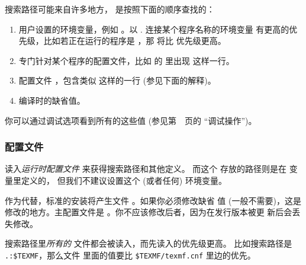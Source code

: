 \documentclass{article}
\begin{document}
搜索路径可能来自许多地方，\KPS{} 是按照下面的顺序查找的：

\begin{enumerate}
\item
  用户设置的环境变量，例如 \@。以 . 连接某个程序名称的环境变量
有更高的优先级，比如若正在运行的程序是 ，那 
将比  优先级更高。
\item
  专门针对某个程序的配置文件，比如  的  里出现
 这样一行。
\item   \KPS{} 配置文件 ，包含类似
   这样的一行 (参见下面的解释)。
\item 编译时的缺省值。
\end{enumerate}
\noindent 你可以通过调试选项看到所有的这些值 (参见第~\pageref{sec:debugging}~页的
``调试操作'')。

\subsubsection{配置文件}

\KPS{} 读入\emph{运行时配置文件}  来获得搜索路径和其他定义。
而这个  存放的路径则是在  变量里定义的，
但我们不建议设置这个 (或者任何) 环境变量。

作为代替，标准的安装将产生文件 。如果你必须修改缺省
值 (一般不需要)，这是修改的地方。主配置文件是
。你不应该修改后者，因为在发行版本被更
新后会丢失修改。

搜索路径里\emph{所有的}  文件都会被读入，而先读入的优先级更高。
比如搜索路径是 \verb|.:$TEXMF|，那么文件  里面的值要比
\verb|$TEXMF/texmf.cnf| 里边的优先。
\end{document}
